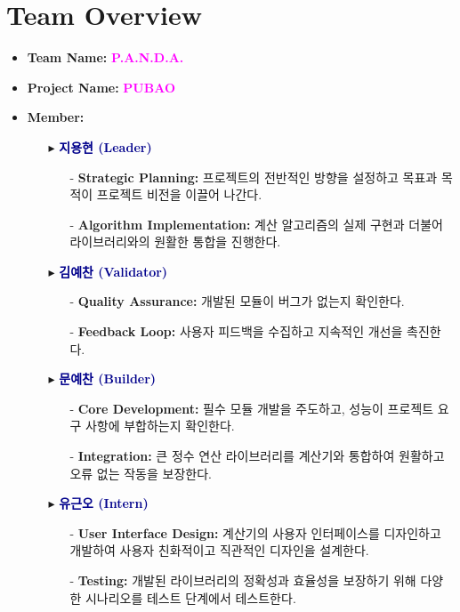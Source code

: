 \documentclass[12pt,a4paper]{article}
\begin{document}
	\section{Team Overview}
	\begin{itemize}
		\item \textbf{Team Name:} \textcolor{magenta}{\bf P.A.N.D.A. 
		 }
		\item \textbf{Project Name:} \textcolor{magenta}{\bf PUBAO }
		\item \textbf{Member:}
		\begin{itemize}
			\item[$\blacktriangleright$] \textcolor{darkblue}{\bf 지용현 (Leader)}
			\begin{itemize}
				\item[-] \textbf{Strategic Planning:} 프로젝트의 전반적인 방향을 설정하고 목표과 목적이 프로젝트 비전을 이끌어 나간다.
				\item[-] \textbf{Algorithm Implementation:} 계산 알고리즘의 실제 구현과 더불어 라이브러리와의 원활한 통합을 진행한다.
			\end{itemize}
		\vspace{8pt}
		\item[$\blacktriangleright$] \textcolor{darkblue}{\bf 김예찬 (Validator) }
		\begin{itemize}
			\item[-] \textbf{Quality Assurance:} 개발된 모듈이 버그가 없는지 확인한다.
			\item[-] \textbf{Feedback Loop:} 사용자 피드백을 수집하고 지속적인 개선을 촉진한다.
		\end{itemize}
	\vspace{8pt}
			\item[$\blacktriangleright$] \textcolor{darkblue}{\bf 문예찬 (Builder)}
		\begin{itemize}
			\item[-] \textbf{Core Development:} 필수 모듈 개발을 주도하고, 성능이 프로젝트 요구 사항에 부합하는지 확인한다.
			\item[-] \textbf{Integration:} 큰 정수 연산 라이브러리를 계산기와 통합하여 원활하고 오류 없는 작동을 보장한다.
		\end{itemize}
	\vspace{8pt}
			\item[$\blacktriangleright$] \textcolor{darkblue}{\bf 유근오 (Intern)}
		\begin{itemize}
			\item[-] \textbf{User Interface Design:} 계산기의 사용자 인터페이스를 디자인하고 개발하여 사용자 친화적이고 직관적인 디자인을 설계한다.
			\item[-] \textbf{Testing:} 개발된 라이브러리의 정확성과 효율성을 보장하기 위해 다양한 시나리오를 테스트 단계에서 테스트한다. 
		\end{itemize}
		\end{itemize}
	\end{itemize}
	
\end{document}
